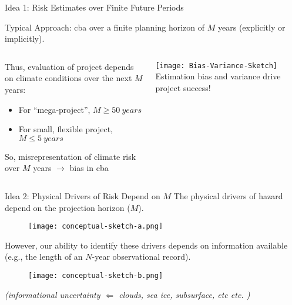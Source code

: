 \documentclass[
  10pt,     %
]{beamer}
\makeatletter
\newcommand*{\eg}{e.g.\@\xspace}
\newcommand*{\etc}{%
    \@ifnextchar{.}%
        {etc}%
        {etc.\@\xspace}%
}
\makeatother
\begin{document}
\begin{frame}{Idea 1: Risk Estimates over Finite Future Periods}
  \begin{alertblock}{Typical Approach:}
    \gls{cba} over a \alert{finite} planning horizon of $M$ years (explicitly or implicitly).
  \end{alertblock}
  \begin{columns}
    \pause
    \begin{column}{0.55\textwidth}
      Thus, evaluation of project depends on climate conditions over the next $M$ years:
      \begin{itemize}
        \item For ``mega-project'', $M \geq \SI{50}{years}$
        \item For small, flexible project, $M \leq \SI{5}{years}$
      \end{itemize}
      \pause
      So, misrepresentation of climate risk over $M$ years $\rightarrow$ bias in \gls{cba}
    \end{column}
    \pause
    \begin{column}{0.4\textwidth}
      \texttt{[image: Bias-Variance-Sketch]}
      {\small Estimation bias and variance drive project success!}
    \end{column}
  \end{columns}
\end{frame}

\begin{frame}{Idea 2: Physical Drivers of Risk Depend on $M$}
  The physical drivers of hazard depend on the projection horizon ($M$).
  \begin{figure}
    \centering
    \texttt{[image: conceptual-sketch-a.png]}\\
  \end{figure}
  \pause
  However, our ability to identify these drivers depends on information available (\eg, the length of an $N$-year observational record).
  \begin{figure}
    \centering
    \texttt{[image: conceptual-sketch-b.png]}
  \end{figure}
  \emph{(informational uncertainty $\Leftarrow$ clouds, sea ice, subsurface, \etc)}
\end{frame}
\end{document}
